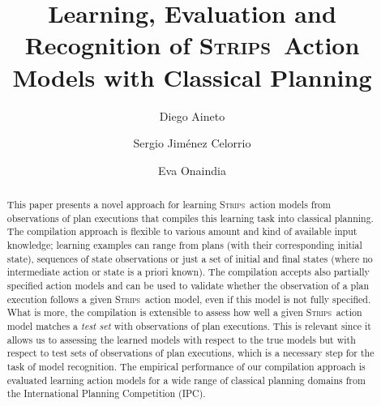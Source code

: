 \documentclass[3p,times]{elsarticle}
\newcommand{\strips}{\textsc{Strips}}     %
\begin{document}
\begin{frontmatter}



\dochead{}

\title{Learning, Evaluation and Recognition of \strips\ Action Models with Classical Planning}
\author[label1]{Diego Aineto}
\author[label1]{Sergio Jim\'{e}nez Celorrio}
\author[label1]{Eva Onaindia}
\address[label1]{Department of Computer Systems and Computation, Universitat Polit\`ecnica de Val\`encia. Spain}




\begin{abstract}
  This paper presents a novel approach for learning \strips\ action models from observations of plan executions that compiles this learning task into classical planning. The compilation approach is flexible to various amount and kind of available input knowledge; learning examples can range from plans (with their corresponding initial state), sequences of state observations or just a set of initial and final states (where no intermediate action or state is a priori known). The compilation accepts also partially specified action models and can be used to validate whether the observation of a plan execution follows a given \strips\ action model, even if this model is not fully specified. What is more, the compilation is extensible to assess how well a given \strips\ action model matches a {\em test set} with observations of plan executions. This is relevant since it allows us to assessing the learned models with respect to the true models but with respect to test sets of observations of plan executions, which is a necessary step for the task of model recognition. The empirical performance of our compilation approach is evaluated learning action models for a wide range of classical planning domains from the International Planning Competition (IPC).
\end{abstract}


\end{frontmatter}
\end{document}
